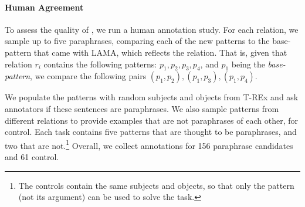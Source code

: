 




\paragraph{Human Agreement}
To assess the quality of \resource{}, we run a
human annotation study.
For each relation, we sample up to
five paraphrases, comparing each of the new patterns to the base-pattern that came with LAMA, which reflects the relation.
That is, given that relation $r_i$ contains the following patterns: $p_1, p_2, p_3, p_4$, and $p_1$ being the \textit{base-pattern}, we compare the following pairs $(p_1, p_2), (p_1, p_3), (p_1,p_4)$.


We populate the patterns with random subjects and objects from T-REx \cite{trex} and ask annotators if these sentences are paraphrases.
We also sample patterns from different relations to provide examples that are not paraphrases of each other, for control.
Each task contains five patterns that are thought
to be paraphrases, and two that are not.\footnote{The
  controls contain the same subjects and objects, so
  that only the pattern (not its argument) can be used to
  solve the task.}
Overall, we collect annotations for 156 paraphrase candidates and 61 control.

